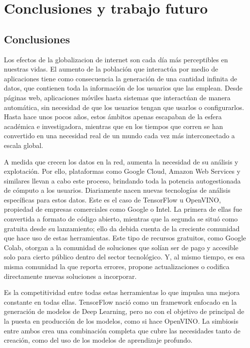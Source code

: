 \cleardoublepage
\mbox{}

\chapter{Conclusiones y trabajo futuro}
\label{ch:chapte6}

\section{Conclusiones}\label{sec:conclusiones}
Los efectos de la globalizacion de internet son cada día más perceptibles en nuestras vidas.
El aumento de la población que interactúa por medio de aplicaciones tiene como consecuencia la generación de una cantidad infinita de datos, que contienen toda la información de los usuarios que las emplean. Desde páginas web, aplicaciones móviles hasta sistemas que interactúan de manera automática, sin necesidad de que los usuarios tengan que usarlos o configurarlos. Hasta hace unos pocos años, estos ámbitos apenas escapaban de la esfera académica e investigadora, mientras que en los tiempos que corren se han convertido en una necesidad real de un mundo cada vez más interconectado a escala global.


A medida que crecen los datos en la red, aumenta la necesidad de su análisis y explotación.
Por ello, plataformas como Google Cloud, Amazon Web Services y similares llevan a cabo este proceso, brindando toda la potencia autogestionada de cómputo a los usuarios.
Diariamente nacen nuevas tecnologías de análisis específicas para estos datos.
Este es el caso de TensorFlow u OpenVINO, propiedad de empresas comerciales como Google o Intel.
La primera de ellas fue convertida a formato de código abierto, mientras que la segunda se situó como gratuita desde su lanzamiento;
ello da debida cuenta de la creciente comunidad que hace uso de estas herramientas.
Este tipo de recursos gratuitos, como Google Colab, otorgan a la comunidad de soluciones que solían ser de pago y accesible solo para cierto público dentro del sector tecnológico.
Y, al mismo tiempo, es esa misma comunidad la que reporta errores, propone actualizaciones o codifica directamente nuevas soluciones a incorporar.

Es la competitividad entre todas estas herramientas lo que impulsa una mejora constante en todas ellas.
TensorFlow nació como un framework enfocado en la generación de modelos de Deep Learning, pero no con el objetivo de principal de la puesta en producción de los modelos, como si hace OpenVINO. La simbiosis entre ambos crea una combinación completa que cubre las necesidades tanto de creación, como del uso de los modelos de aprendizaje profundo.

